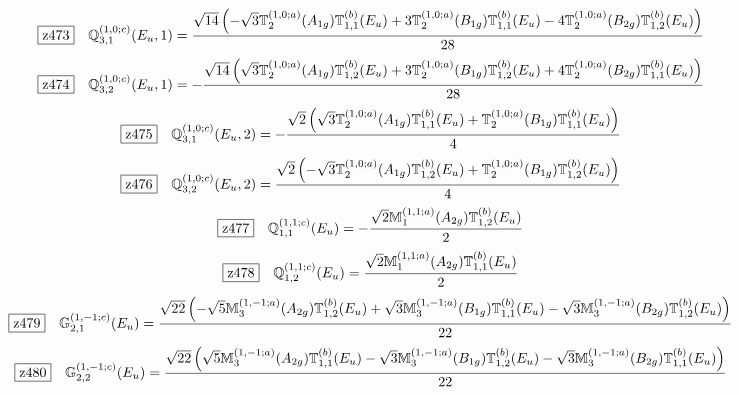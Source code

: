 \documentclass[fleqn,10pt,landscape]{jsarticle}
\begin{document}
\begin{dmath*}
\hspace*{3mm}\fbox{z473}\quad \mathbb{Q}_{3,1}^{(1,0;c)}(E_{u},1)=\frac{\sqrt{14} \left(- \sqrt{3} \mathbb{T}_{2}^{(1,0;a)}(A_{1g}) \mathbb{T}_{1,1}^{(b)}(E_{u}) + 3 \mathbb{T}_{2}^{(1,0;a)}(B_{1g}) \mathbb{T}_{1,1}^{(b)}(E_{u}) - 4 \mathbb{T}_{2}^{(1,0;a)}(B_{2g}) \mathbb{T}_{1,2}^{(b)}(E_{u})\right)}{28}
\end{dmath*}
\begin{dmath*}
\hspace*{3mm}\fbox{z474}\quad \mathbb{Q}_{3,2}^{(1,0;c)}(E_{u},1)=- \frac{\sqrt{14} \left(\sqrt{3} \mathbb{T}_{2}^{(1,0;a)}(A_{1g}) \mathbb{T}_{1,2}^{(b)}(E_{u}) + 3 \mathbb{T}_{2}^{(1,0;a)}(B_{1g}) \mathbb{T}_{1,2}^{(b)}(E_{u}) + 4 \mathbb{T}_{2}^{(1,0;a)}(B_{2g}) \mathbb{T}_{1,1}^{(b)}(E_{u})\right)}{28}
\end{dmath*}
\begin{dmath*}
\hspace*{3mm}\fbox{z475}\quad \mathbb{Q}_{3,1}^{(1,0;c)}(E_{u},2)=- \frac{\sqrt{2} \left(\sqrt{3} \mathbb{T}_{2}^{(1,0;a)}(A_{1g}) \mathbb{T}_{1,1}^{(b)}(E_{u}) + \mathbb{T}_{2}^{(1,0;a)}(B_{1g}) \mathbb{T}_{1,1}^{(b)}(E_{u})\right)}{4}
\end{dmath*}
\begin{dmath*}
\hspace*{3mm}\fbox{z476}\quad \mathbb{Q}_{3,2}^{(1,0;c)}(E_{u},2)=\frac{\sqrt{2} \left(- \sqrt{3} \mathbb{T}_{2}^{(1,0;a)}(A_{1g}) \mathbb{T}_{1,2}^{(b)}(E_{u}) + \mathbb{T}_{2}^{(1,0;a)}(B_{1g}) \mathbb{T}_{1,2}^{(b)}(E_{u})\right)}{4}
\end{dmath*}
\begin{dmath*}
\hspace*{3mm}\fbox{z477}\quad \mathbb{Q}_{1,1}^{(1,1;c)}(E_{u})=- \frac{\sqrt{2} \mathbb{M}_{1}^{(1,1;a)}(A_{2g}) \mathbb{T}_{1,2}^{(b)}(E_{u})}{2}
\end{dmath*}
\begin{dmath*}
\hspace*{3mm}\fbox{z478}\quad \mathbb{Q}_{1,2}^{(1,1;c)}(E_{u})=\frac{\sqrt{2} \mathbb{M}_{1}^{(1,1;a)}(A_{2g}) \mathbb{T}_{1,1}^{(b)}(E_{u})}{2}
\end{dmath*}
\begin{dmath*}
\hspace*{3mm}\fbox{z479}\quad \mathbb{G}_{2,1}^{(1,-1;c)}(E_{u})=\frac{\sqrt{22} \left(- \sqrt{5} \mathbb{M}_{3}^{(1,-1;a)}(A_{2g}) \mathbb{T}_{1,2}^{(b)}(E_{u}) + \sqrt{3} \mathbb{M}_{3}^{(1,-1;a)}(B_{1g}) \mathbb{T}_{1,1}^{(b)}(E_{u}) - \sqrt{3} \mathbb{M}_{3}^{(1,-1;a)}(B_{2g}) \mathbb{T}_{1,2}^{(b)}(E_{u})\right)}{22}
\end{dmath*}
\begin{dmath*}
\hspace*{3mm}\fbox{z480}\quad \mathbb{G}_{2,2}^{(1,-1;c)}(E_{u})=\frac{\sqrt{22} \left(\sqrt{5} \mathbb{M}_{3}^{(1,-1;a)}(A_{2g}) \mathbb{T}_{1,1}^{(b)}(E_{u}) - \sqrt{3} \mathbb{M}_{3}^{(1,-1;a)}(B_{1g}) \mathbb{T}_{1,2}^{(b)}(E_{u}) - \sqrt{3} \mathbb{M}_{3}^{(1,-1;a)}(B_{2g}) \mathbb{T}_{1,1}^{(b)}(E_{u})\right)}{22}
\end{dmath*}
\vspace{5mm}
\end{document}
